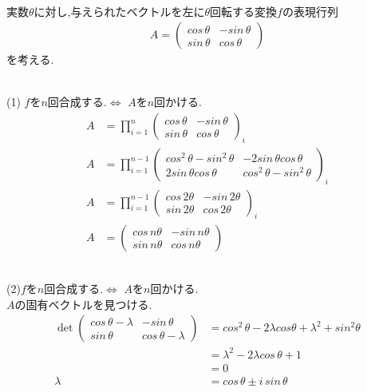 \documentclass{jsarticle}
\begin{document}
\leavevmode\\
実数$\theta $に対し,与えられたベクトルを左に$\theta $回転する変換$f$の表現行列
\begin{align*}
  A = \begin{pmatrix}cos\,\theta &-sin\,\theta \\sin\,\theta &cos\,\theta \end{pmatrix}
\end{align*}
を考える.

\leavevmode\\
(1) \qquad $f$を$n$回合成する.$\Longleftrightarrow$ $A$を$n$回かける.
\begin{align*}
  A &= \prod_{i=1}^n \begin{pmatrix}cos\,\theta &-sin\,\theta \\sin\,\theta &cos\,\theta \end{pmatrix}_i\\
  A &= \prod_{i=1}^{n-1} \begin{pmatrix}cos^2\,\theta -sin^2\,\theta &-2sin\,\theta cos\,\theta \\2sin\,\theta cos\,\theta &cos^2\,\theta -sin^2\,\theta \end{pmatrix}_i\\
  A &= \prod_{i=1}^{n-1} \begin{pmatrix}cos\,2\theta &-sin\,2\theta \\sin\,2\theta &cos\,2\theta \end{pmatrix}_i\\
  A &= \begin{pmatrix}cos\,n\theta &-sin\,n\theta \\sin\,n\theta &cos\,n\theta \end{pmatrix}
\end{align*}  

\leavevmode\\
(2)\qquad $f$を$n$回合成する.$\Longleftrightarrow$ $A$を$n$回かける.\\
$A$の固有ベクトルを見つける.
\begin{align*}
  \det \begin{pmatrix}cos\,\theta -\lambda &-sin\,\theta \\sin\,\theta &cos\,\theta -\lambda \end{pmatrix}
  &= cos^2\,\theta -2\lambda cos\theta +\lambda ^2 + sin^2\theta \\
  &=\lambda ^2 -2\lambda cos\,\theta +1\\
  &=0\\
\lambda &= cos\,\theta \pm i\,sin\,\theta\\
\end{align*}  
\end{document}
